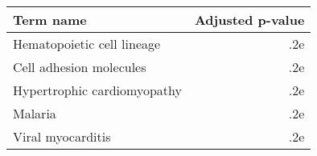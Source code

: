 \begin{tabular}{lr}
\toprule
                  Term name &  Adjusted p-value \\
\midrule
 Hematopoietic cell lineage &               .2e \\
    Cell adhesion molecules &               .2e \\
Hypertrophic cardiomyopathy &               .2e \\
                    Malaria &               .2e \\
          Viral myocarditis &               .2e \\
\bottomrule
\end{tabular}
